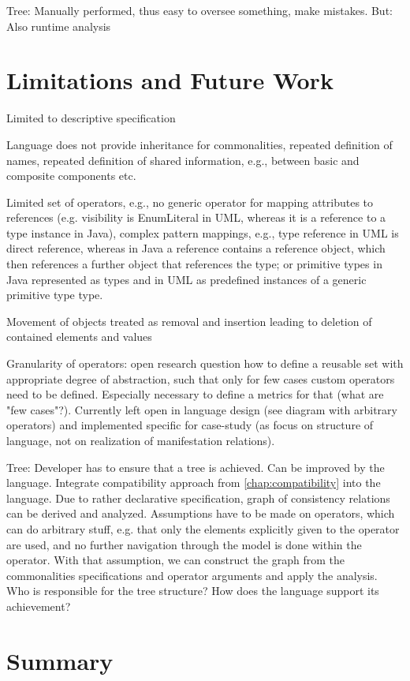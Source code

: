 Tree: Manually performed, thus easy to oversee something, make mistakes. But: Also runtime analysis


\section{Limitations and Future Work}
Limited to descriptive specification

Language does not provide inheritance for commonalities, repeated definition of names, repeated definition of shared information, e.g., between basic and composite components etc.

Limited set of operators, e.g., no generic operator for mapping attributes to references (e.g. visibility is EnumLiteral in UML, whereas it is a reference to a type instance in Java), complex pattern mappings, e.g., type reference in UML is direct reference, whereas in Java a reference contains a reference object, which then references a further object that references the type; or primitive types in Java represented as types and in UML as predefined instances of a generic primitive type type.

Movement of objects treated as removal and insertion leading to deletion of contained elements and values


Granularity of operators: open research question how to define a reusable set with appropriate degree of abstraction, such that only for few cases custom operators need to be defined. Especially necessary to define a metrics for that (what are "few cases"?). Currently left open in language design (see diagram with arbitrary operators) and implemented specific for case-study (as focus on structure of language, not on realization of manifestation relations).

Tree: Developer has to ensure that a tree is achieved. Can be improved by the language. Integrate compatibility approach from \autoref{chap:compatibility} into the language. Due to rather declarative specification, graph of consistency relations can be derived and analyzed. Assumptions have to be made on operators, which can do arbitrary stuff, e.g. that only the elements explicitly given to the operator are used, and no further navigation through the model is done within the operator. With that assumption, we can construct the graph from the commonalities specifications and operator arguments and apply the analysis.
Who is responsible for the tree structure? How does the language support its achievement?

\section{Summary}




